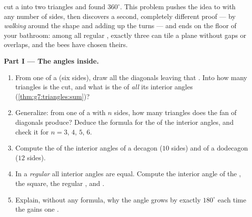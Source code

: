 \begin{problem}
\label{pb:g7:triangles:1}
 cut a  into two triangles
and found $360^\circ$. This problem pushes the idea to 
with any number of sides, then discovers a second, completely
different proof --- by \emph{walking} around the shape and adding
up the turns --- and ends on the floor of your bathroom: among all
regular , exactly three can tile a plane without gaps or
overlaps, and the bees have chosen theirs.

\medskip
\noindent\textbf{Part I --- The angles inside.}
\begin{enumerate}
  \item From one  of a  (six sides), draw all the
        diagonals leaving that . Into how many triangles is
        the  cut, and what is the  of \emph{all} its
        interior angles (\cref{thm:g7:triangles:sum})?
  \item Generalize: from one  of a  with $n$ sides,
        how many triangles does the fan of diagonals produce?
        Deduce the formula for the  of the interior angles,
        and check it for $n = 3$, $4$, $5$, $6$.
  \item Compute the  of the interior angles of a decagon
        ($10$ sides) and of a dodecagon ($12$ sides).
  \item In a \emph{regular}  all interior angles are
        equal. Compute the interior angle of the , the square, the regular ,  and
        .
  \item Explain, without any formula, why the angle  grows by
        exactly $180^\circ$ each time the  gains one
        .
\end{enumerate}


\end{problem}
